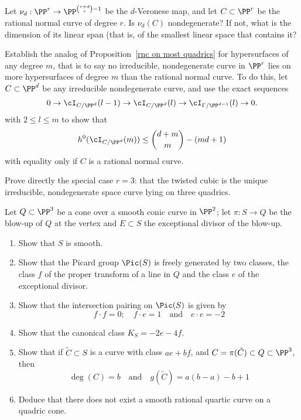 \begin{exercise}
 Let $\nu_d: \PP^r \to \PP^{\binom{r+d}{r}-1}$ be the $d$-Veronese map, and let $C\subset \PP^r$ be the rational normal curve of degree $r$. Is $\nu_d(C)$ nondegenerate? If not, what is the dimension of its linear span (that is, of the smallest linear
 space that contains it?
\end{exercise}

\begin{exercise}
Establish the analog of Proposition~\ref{rnc on most quadrics} for hypersurfaces of any degree $m$, that is to say no irreducible, nondegenerate curve in $\PP^r$ lies on more hypersurfaces of degree $m$ than the rational normal curve.
To do this, let $C\subset \PP^d$ be any irreducible nondegenerate curve, and use the exact sequences
$$
0 \to \cI_{C/\PP^d}(l-1) \to \cI_{C/\PP^d}(l) \to \cI_{\Gamma/\PP^{d-1}}(l) \to 0.
$$ 
with $2 \leq l \leq m$ to show that
$$
h^0(\cI_{C/\PP^d}(m)) \leq  \binom{d+m}{m} - (md+1)
$$
with equality only if $C$ is a rational normal curve.
\end{exercise}

\begin{exercise}
Prove directly  the special case $r=3$: that the twisted cubic is the unique irreducible, nondegenerate space curve lying on three quadrics. 
\end{exercise}


\begin{exercise}\label{F2}
Let $Q \subset \PP^3$ be a cone over a smooth conic curve in $\PP^2$; let $\pi : S \to Q$ be the blow-up of $Q$ at the vertex and $E \subset S$ the exceptional divisor of the blow-up.
\begin{enumerate}
\item Show that $S$ is smooth.
\item Show that the Picard group $\Pic(S)$ is freely generated by two classes, the class $f$ of the proper transform of a line in $Q$ and the class $e$ of the exceptional divisor.
\item\label{intersections on a quadric} Show that the intersection pairing on $\Pic(S)$ is given by
$$
f \cdot f = 0; \quad f \cdot e = 1 \quad \text{and} \quad e \cdot e = -2
$$
\item Show that the canonical class $K_S = -2e-4f$.
\item Show that if $\tilde C \subset S$ is a curve with class $ae + bf$, and
$C = \pi(\tilde C) \subset Q \subset \PP^3$, then
$$
\deg(C) = b \quad \text{and} \quad g(\tilde C) = a(b-a) -b +1
$$
\item Deduce that there does not exist a smooth rational quartic curve on a quadric cone.
\end{enumerate}
\end{exercise}

